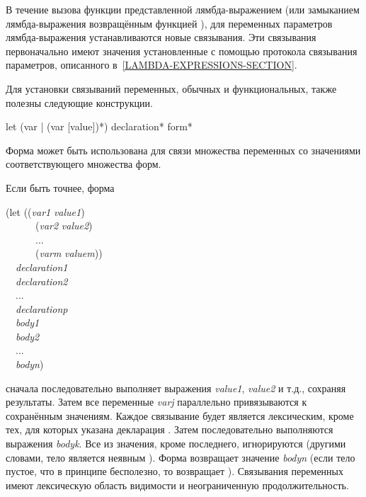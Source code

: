 В течение вызова функции представленной лямбда-выражением (или замыканием
лямбда-выражения возвращённым функцией ),
для переменных параметров лямбда-выражения устанавливаются новые связывания. Эти
связывания первоначально имеют значения установленные с помощью протокола
связывания параметров, описанного в~\ref{LAMBDA-EXPRESSIONS-SECTION}.

Для установки связываний переменных, обычных и функциональных, также полезны
следующие конструкции.

\begin{defspec}
let ({var | (var [value])}*) {declaration}* {form}*

Форма  может быть использована для связи множества переменных со
значениями соответствующего множества форм.

Если быть точнее, форма
\begin{lisp}
(let ((\emph{var1} \emph{value1}) \\
~~~~~~(\emph{var2} \emph{value2}) \\
~~~~~~... \\
~~~~~~(\emph{varm} \emph{valuem})) \\
~~\emph{declaration1} \\
~~\emph{declaration2} \\
~~... \\
~~\emph{declarationp} \\
~~\emph{body1} \\
~~\emph{body2} \\
~~... \\
~~\emph{bodyn})
\end{lisp}
сначала последовательно выполняет выражения \emph{value1}, \emph{value2} и т.д.,
сохраняя результаты.
Затем все переменные \emph{varj} параллельно привязываются к сохранённым
значениям. Каждое связывание будет является лексическим, кроме тех, для которых
указана декларация .
Затем последовательно выполняются выражения \emph{bodyk}. Все из значения, кроме
последнего, игнорируются (другими словами, тело  является неявным
).
Форма  возвращает значение \emph{bodyn} (если тело пустое, что в
принципе бесполезно, то  возвращает {\false}).
Связывания переменных имеют лексическую область видимости и неограниченную
продолжительность.


\end{defspec}
